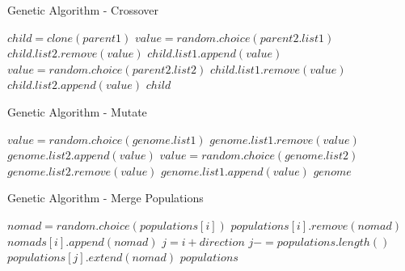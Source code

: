 \documentclass{article}
\begin{document}
\begin{algorithm}
\caption{Genetic Algorithm - Crossover}
\begin{algorithmic}
	\State $child = clone(parent1)$
			\State $value = random.choice(parent2.list1)$
				\State $child.list2.remove(value)$
				\State $child.list1.append(value)$
			\EndIf
		\EndFor
	\EndIf
			\State $value = random.choice(parent2.list2)$
				\State $child.list1.remove(value)$
				\State $child.list2.append(value)$
			\EndIf
		\EndFor
	\EndIf
	\State\Return $child$
\EndFunction
\end{algorithmic}
\end{algorithm}

\begin{algorithm}
\caption{Genetic Algorithm - Mutate}
\begin{algorithmic}
				\State $value = random.choice(genome.list1)$
				\State $genome.list1.remove(value)$
				\State $genome.list2.append(value)$
			\EndIf
		\Else
				\State $value = random.choice(genome.list2)$
				\State $genome.list2.remove(value)$
				\State $genome.list1.append(value)$
			\EndIf
		\EndIf
	\EndFor
	\State\Return $genome$
\EndFunction
\end{algorithmic}
\end{algorithm}

\begin{algorithm}
\caption{Genetic Algorithm - Merge Populations}
\begin{algorithmic}
			\State $nomad = random.choice(populations[i])$
			\State $populations[i].remove(nomad)$
			\State $nomads[i].append(nomad)$
		\EndFor
	\EndFor
		\State $j = i + direction$
			\State $j -= populations.length()$
		\EndIf
		\State $populations[j].extend(nomad)$
	\EndFor
	\State\Return $populations$
\EndFunction
\end{algorithmic}
\end{algorithm}
\end{document}
